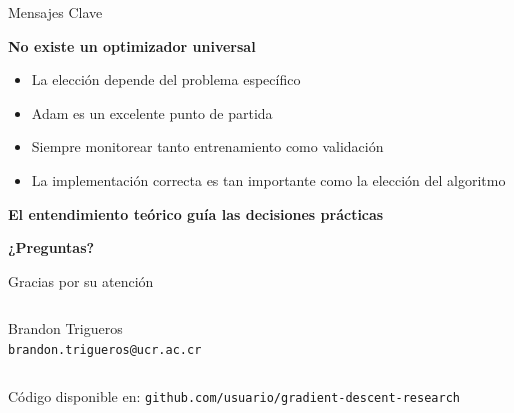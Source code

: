\documentclass[10pt]{beamer}
\begin{document}
\begin{frame}{Mensajes Clave}
\begin{center}
\Large
\textbf{No existe un optimizador universal}
\end{center}

\vspace{0.5cm}

\begin{itemize}
\item La elección depende del problema específico
\item Adam es un excelente punto de partida
\item Siempre monitorear tanto entrenamiento como validación
\item La implementación correcta es tan importante como la elección del algoritmo
\end{itemize}

\vspace{0.5cm}

\begin{center}
\textcolor{azulUni}{\textbf{El entendimiento teórico guía las decisiones prácticas}}
\end{center}
\end{frame}

\begin{frame}[plain]
\begin{center}
{\Huge \textbf{¿Preguntas?}}

\vspace{1.5cm}

{\Large Gracias por su atención}

\vspace{1cm}

\begin{columns}
\begin{column}{0.5\textwidth}
\centering
Brandon Trigueros\\
\texttt{brandon.trigueros@ucr.ac.cr}
\end{column}
\end{columns}

\vspace{1cm}

{\small Código disponible en: \texttt{github.com/usuario/gradient-descent-research}}
\end{center}
\end{frame}

\appendix
\end{document}
